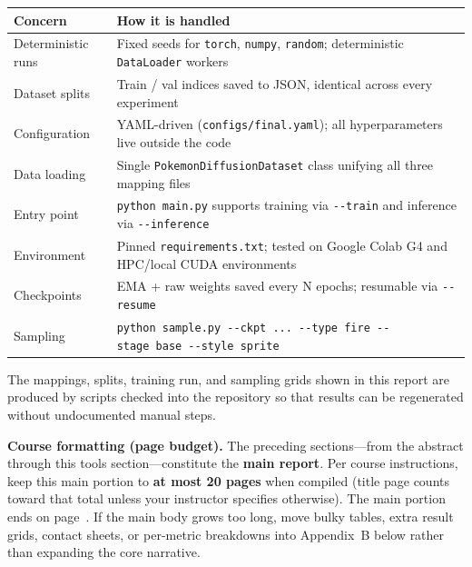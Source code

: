 \documentclass[
]{article}
\begin{document}
\begin{longtable}[]{@{}
  >{\raggedright\arraybackslash}p{}
  >{\raggedright\arraybackslash}p{}@{}}
\toprule\noalign{}
\begin{minipage}[b]{\linewidth}\raggedright
Concern
\end{minipage} & \begin{minipage}[b]{\linewidth}\raggedright
How it is handled
\end{minipage} \\
\midrule\noalign{}
\endhead
\bottomrule\noalign{}
\endlastfoot
Deterministic runs & Fixed seeds for \texttt{torch}, \texttt{numpy},
\texttt{random}; deterministic \texttt{DataLoader} workers \\
Dataset splits & Train / val indices saved to JSON, identical across
every experiment \\
Configuration & YAML-driven (\texttt{configs/final.yaml}); all
hyperparameters live outside the code \\
Data loading & Single \texttt{PokemonDiffusionDataset} class unifying
all three mapping files \\
Entry point &
\texttt{python\ main.py} supports training via \texttt{-\/-train} and
inference via \texttt{-\/-inference} \\
Environment & Pinned \texttt{requirements.txt}; tested on Google Colab
G4 and HPC/local CUDA environments \\
Checkpoints & EMA + raw weights saved every N epochs; resumable via
\texttt{-\/-resume} \\
Sampling &
\texttt{python\ sample.py\ -\/-ckpt\ ...\ -\/-type\ fire\ -\/-stage\ base\ -\/-style\ sprite} \\
\end{longtable}

The mappings, splits, training run, and sampling grids shown in this
report are produced by scripts checked into the repository so that
results can be regenerated without undocumented manual steps.

\begin{tcolorbox}[
  colback=zebra,
  colframe=mutedBorder,
  boxrule=0.8pt,
  arc=2pt,
  left=10pt, right=10pt, top=8pt, bottom=8pt,
  before skip=1.2em, after skip=1.2em
]
\textbf{Course formatting (page budget).} The preceding sections---from
the abstract through this tools section---constitute the
\textbf{main report}. Per course instructions, keep this main portion to
\textbf{at most 20 pages} when compiled (title page counts toward that
total unless your instructor specifies otherwise). The main portion ends
on page~\pageref{main-report-end}. If the main body grows too long, move
bulky tables, extra result grids, contact sheets, or per-metric breakdowns
into Appendix~B below rather than expanding the core narrative.
\end{tcolorbox}
\end{document}
